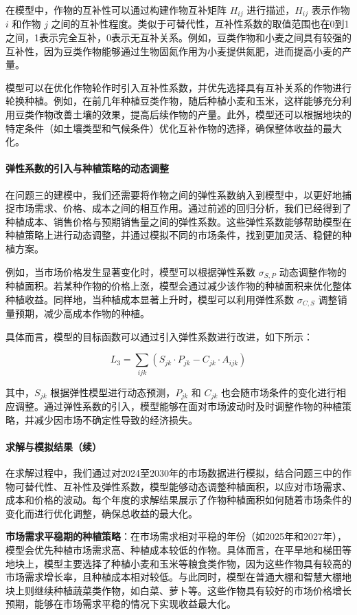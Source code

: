 \documentclass[12pt,a4paper]{nmmcm}
\begin{document}
在模型中，作物的互补性可以通过构建作物互补矩阵 $H_{ij}$ 进行描述，$H_{ij}$ 表示作物 $i$ 和作物 $j$ 之间的互补性程度。类似于可替代性，互补性系数的取值范围也在0到1之间，1表示完全互补，0表示无互补关系。例如，豆类作物和小麦之间具有较强的互补性，因为豆类作物能够通过生物固氮作用为小麦提供氮肥，进而提高小麦的产量。

模型可以在优化作物轮作时引入互补性系数，并优先选择具有互补关系的作物进行轮换种植。例如，在前几年种植豆类作物，随后种植小麦和玉米，这样能够充分利用豆类作物改善土壤的效果，提高后续作物的产量。此外，模型还可以根据地块的特定条件（如土壤类型和气候条件）优化互补作物的选择，确保整体收益的最大化。

\paragraph{弹性系数的引入与种植策略的动态调整}

在问题三的建模中，我们还需要将作物之间的弹性系数纳入到模型中，以更好地捕捉市场需求、价格、成本之间的相互作用。通过前述的回归分析，我们已经得到了种植成本、销售价格与预期销售量之间的弹性系数。这些弹性系数能够帮助模型在种植策略上进行动态调整，并通过模拟不同的市场条件，找到更加灵活、稳健的种植方案。

例如，当市场价格发生显著变化时，模型可以根据弹性系数 $\sigma_{S,P}$ 动态调整作物的种植面积。若某种作物的价格上涨，模型会通过减少该作物的种植面积来优化整体种植收益。同样地，当种植成本显著上升时，模型可以利用弹性系数 $\sigma_{C,S}$ 调整销量预期，减少高成本作物的种植。

具体而言，模型的目标函数可以通过引入弹性系数进行改进，如下所示：

\[
L_3 = \sum_{ijk} \left( S_{jk} \cdot P_{jk} - C_{jk} \cdot A_{ijk} \right)
\]

其中，$S_{jk}$ 根据弹性模型进行动态预测，$P_{jk}$ 和 $C_{jk}$ 也会随市场条件的变化进行相应调整。通过弹性系数的引入，模型能够在面对市场波动时及时调整作物的种植策略，并减少因市场不确定性导致的经济损失。

\paragraph{求解与模拟结果（续）}

在求解过程中，我们通过对2024至2030年的市场数据进行模拟，结合问题三中的作物可替代性、互补性及弹性系数，模型能够动态调整种植面积，以应对市场需求、成本和价格的波动。每个年度的求解结果展示了作物种植面积如何随着市场条件的变化而进行优化调整，确保总收益的最大化。

\textbf{市场需求平稳期的种植策略}：在市场需求相对平稳的年份（如2025年和2027年），模型会优先种植市场需求高、种植成本较低的作物。具体而言，在平旱地和梯田等地块上，模型主要选择了种植小麦和玉米等粮食类作物，因为这些作物具有较高的市场需求增长率，且种植成本相对较低。与此同时，模型在普通大棚和智慧大棚地块上则继续种植蔬菜类作物，如白菜、萝卜等。这些作物具有较好的市场价格增长预期，能够在市场需求平稳的情况下实现收益最大化。
\end{document}
